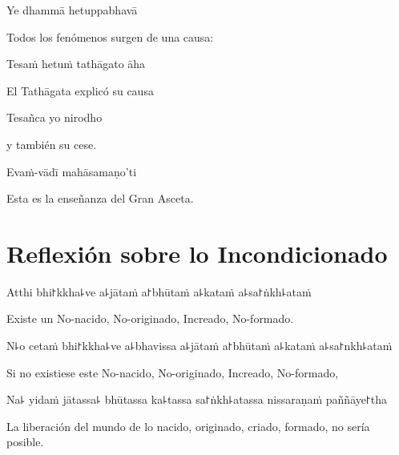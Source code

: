 Ye dhammā hetuppabhavā

\begin{english}
  Todos los fenómenos surgen de una causa:
\end{english}

Tesaṁ hetuṁ tathāgato āha

\begin{english}
  El Tathāgata explicó su causa
\end{english}

Tesañca yo nirodho

\begin{english}
  y también su cese.
\end{english}

Evaṁ-vādī mahāsamaṇo'ti

\begin{english}
  Esta es la enseñanza del Gran Asceta.
\end{english}


\chapter[Incondicionado]{Reflexión sobre lo Incondicionado}


\begin{leader}
\end{leader}

Atthi bhi꜓kkha꜕ve a꜕jātaṁ a꜓bhūtaṁ a꜕kataṁ a꜕sa꜓ṅkh꜕ataṁ

\begin{english}
  Existe un No-nacido, No-originado, Increado, No-formado.
\end{english}

N꜕o cetaṁ bhi꜓kkha꜕ve a꜕bhavissa a꜕jātaṁ a꜓bhūtaṁ a꜕kataṁ a꜕sa꜓nkh꜕ataṁ

\begin{english}
 Si no existiese este No-nacido, No-originado, Increado, No-formado,
\end{english}

Na꜕ yidaṁ jātassa꜕ bhūtassa ka꜕tassa sa꜓ṅkh꜕atassa nissaraṇaṁ paññāye꜓tha

\begin{english}
  La liberación del mundo de lo nacido, originado, criado, formado, no sería posible.
\end{english}

